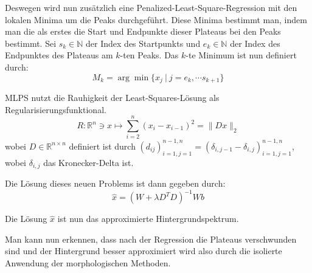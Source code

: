 \documentclass{article}
\newcommand{\R}[0]{\mathbb{R}}
\newcommand{\N}[0]{\mathbb{N}}
\begin{document}
Deswegen wird nun zusätzlich eine Penalized-Least-Square-Regression mit den lokalen Minima um die Peaks durchgeführt.
Diese Minima bestimmt man, indem man die als erstes die Start und Endpunkte dieser Plateaus bei den Peaks bestimmt.
Sei $s_k \in \N$ der Index des Startpunkts und $e_k \in \N$ der Index des Endpunktes des Plateaus am $k$-ten Peaks. Das $k$-te Minimum ist nun definiert durch:
\begin{equation}
    M_k = \arg\min \{x_j \: | \: j=e_k,\cdots s_{k+1}\}
\end{equation}

MLPS nutzt die Rauhigkeit der Least-Squares-Lösung als Regularisierungsfunktional.
\begin{equation}
    R: \R^n \ni x \mapsto \sum_{i=2}^{n} (x_i - x_{i-1})^2 = \lVert Dx \rVert_2
\end{equation}
wobei $D \in \R^{n\times n}$ definiert ist durch $(d_{ij})_{i=1,j=1}^{n-1,n} = (\delta_{i,j-1} - \delta_{i,j})_{i=1,j=1}^{n-1,n}$, wobei $\delta_{i,j}$ das Kronecker-Delta ist.

Die Lösung dieses neuen Problems ist dann gegeben durch:
\begin{equation}
    \hat{x} = (W + \lambda D^TD)^{-1}Wb
\end{equation}

Die Lösung $\hat{x}$ ist nun das approximierte Hintergrundspektrum.

Man kann nun erkennen, dass nach der Regression die Plateaus verschwunden sind und der Hintergrund besser approximiert wird also durch die isolierte Anwendung der morphologischen Methoden. 
\end{document}
